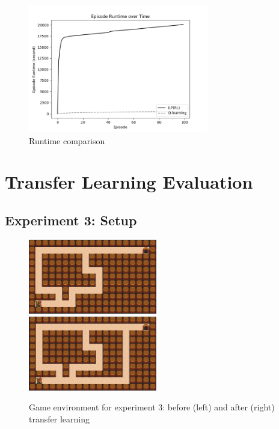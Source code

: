 \begin{figure}[!htb]
\centering
\includegraphics[width=0.7\textwidth]{./figures/experiment2_runtime}
\caption{Runtime comparison}
\label{experiment2_runtime}
\end{figure}

\clearpage
\newpage
\section{Transfer Learning Evaluation}
\label{sec:transfer_learning_evaluation}

\subsection{Experiment 3: Setup}
\label{subsec:experiement3_setup}

\begin{figure}[!htb]
\centerline{
\includegraphics[width=0.5\textwidth]{./figures/experiment3_before}
\includegraphics[width=0.5\textwidth]{./figures/experiment3_after}
}
\caption{Game environment for experiment 3: before (left) and after (right) transfer learning}
\label{experiment3_setup}
\end{figure}


